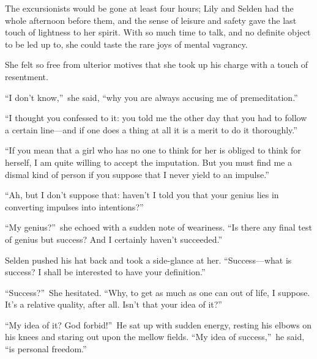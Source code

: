 \documentclass[12pt,a4paper]{book}
\begin{document}
The excursionists would be gone at least four hours; Lily and
Selden had the whole afternoon before them, and the sense of
leisure and safety gave the last touch of lightness to her
spirit. With so much time to talk, and no definite object to be
led up to, she could taste the rare joys of mental vagrancy.





She felt so free from ulterior motives that she took up his
charge with a touch of resentment.





``I don't know,''\ she said, ``why you are always accusing me of
premeditation.''





``I thought you confessed to it: you told me the other day that
you had to follow a certain line---and if one does a thing at all
it is a merit to do it thoroughly.''





``If you mean that a girl who has no one to think for her is
obliged to think for herself, I am quite willing to accept the
imputation. But you must find me a dismal kind of person if you
suppose that I never yield to an impulse.''





``Ah, but I don't suppose that: haven't I told you that your
genius lies in converting impulses into intentions?''





``My genius?''\ she echoed with a sudden note of weariness. ``Is
there any final test of genius but success? And I certainly
haven't succeeded.''





Selden pushed his hat back and took a side-glance at her. 
``Success---what is success? I shall be interested to have your
definition.''





``Success?''\ She hesitated. ``Why, to get as much as one can out of
life, I suppose. It's a relative quality, after all. Isn't that
your idea of it?''





``My idea of it? God forbid!''\ He sat up with sudden energy,
resting his elbows on his knees and staring out upon the mellow
fields. ``My idea of success,''\ he said, ``is personal freedom.''
\end{document}
